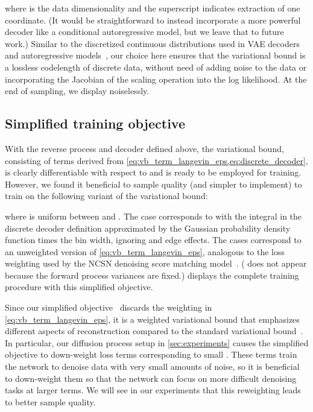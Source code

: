 \documentclass{article}
\begin{document}
where  is the data dimensionality and the  superscript indicates extraction of one coordinate.
(It would be straightforward to instead incorporate a more powerful decoder like a conditional autoregressive model, but we leave that to future work.) Similar to the discretized continuous distributions used in VAE decoders and autoregressive models~\citep{kingma2016improved,salimans2017pixelcnn++}, our choice here ensures that the variational bound is a lossless codelength of discrete data, without need of adding noise to the data or incorporating the Jacobian of the scaling operation into the log likelihood. At the end of sampling, we display  noiselessly.

\subsection{Simplified training objective}
\label{sec:simplified_training_objective}


With the reverse process and decoder defined above, the variational bound, consisting of terms derived from \cref{eq:vb_term_langevin_eps,eq:discrete_decoder}, is clearly differentiable with respect to  and is ready to be employed for training. However, we found it beneficial to sample quality (and simpler to implement) to train on the following variant of the variational bound:

where  is uniform between  and . The  case corresponds to  with the integral in the discrete decoder definition  approximated by the Gaussian probability density function times the bin width, ignoring  and edge effects. The  cases correspond to an unweighted version of \cref{eq:vb_term_langevin_eps}, analogous to the loss weighting used by the NCSN denoising score matching model~\citep{song2019generative}. ( does not appear because the forward process variances  are fixed.)
 displays the complete training procedure with this simplified objective.

Since our simplified objective~ discards the weighting in \cref{eq:vb_term_langevin_eps}, it is a weighted variational bound that emphasizes different aspects of reconstruction compared to the standard variational bound~\citep{gregor2016towards,higgins2017beta}.
In particular, our diffusion process setup in \cref{sec:experiments} causes the simplified objective to down-weight loss terms corresponding to small . These terms train the network to denoise data with very small amounts of noise, so it is beneficial to down-weight them so that the network can focus on more difficult denoising tasks at larger  terms. We will see in our experiments that this reweighting leads to better sample quality.
\end{document}
